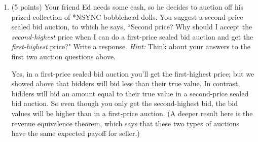 \documentclass[twoside]{article}
\newcommand{\mybiggerskip}{\vspace{1.5in}}
\begin{document}
\begin{enumerate}
\begin{enumerate}



    
    \item (5 points) Your friend Ed needs some cash, so he decides to auction off his prized collection of *NSYNC bobblehead dolls. You suggest a second-price sealed bid auction, to which he says, ``Second price? Why should I accept the \emph{second-highest} price when I can do a first-price sealed bid auction and get the \emph{first-highest} price?" Write a response. \emph{Hint: }Think about your answers to the first two auction questions above.
    \begin{EXAM}\mybiggerskip\end{EXAM}

\begin{KEY}
Yes, in a first-price sealed bid auction you'll get the first-highest price; but we showed above that bidders will bid less than their true value. In contrast, bidders will bid an amount equal to their true value in a second-price sealed bid auction. So even though you only get the second-highest bid, the bid values will be higher than in a first-price auction. (A deeper result here is the revenue equivalence theorem, which says that these two types of auctions have the same expected payoff for seller.)    
\end{KEY}

    \end{enumerate}






\end{enumerate}
\end{document}
